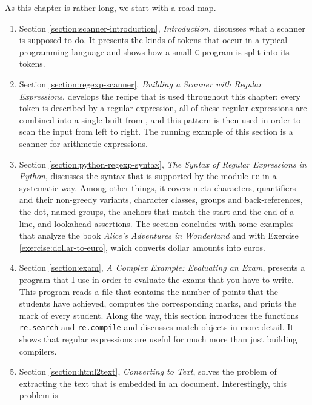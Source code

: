 As this chapter is rather long, we start with a road map.
\begin{enumerate}
\item Section \ref{section:scanner-introduction}, \emph{Introduction}, discusses what a
      scanner is supposed to do.  It presents the kinds of tokens that occur in a typical
      programming language and shows how a small \texttt{C} program is split into its tokens.
\item Section \ref{section:regexp-scanner}, \emph{Building a Scanner with Regular Expressions}, develops the
      recipe that is used throughout this chapter: every token is described by a regular expression, all of
      these regular expressions are combined into a single  built from 
      , and this pattern is then used in order to
      scan the input from left 
      to right.  The running example of this section is a scanner for arithmetic expressions.
\item Section \ref{section:python-regexp-syntax},
      \emph{The Syntax of Regular Expressions in \textsl{Python}}, 
      discusses the syntax that is supported by the module \texttt{re} in a systematic
      way.  Among other things, 
      it covers meta-characters, quantifiers and their non-greedy variants, character classes, groups and
      back-references, the dot, named groups, the anchors that match the start and the end of a line, and
      lookahead assertions.  The section concludes with some examples that analyze the book \emph{Alice's
      Adventures in Wonderland} and with Exercise \ref{exercise:dollar-to-euro}, which
      converts dollar amounts into euros.  
\item Section \ref{section:exam}, \emph{A Complex Example: Evaluating an Exam}, presents a
      program that I use in 
      order to evaluate the exams that you have to write.  This program reads a file that contains the number of
      points that the students have achieved, computes the corresponding marks, and prints the mark of every
      student.  Along the way, this section introduces the functions \texttt{re.search} and
      \texttt{re.compile} and discusses match objects in more detail.  It shows that regular expressions are useful for
      much more than just building compilers.
\item Section \ref{section:html2text}, \emph{Converting  to Text}, solves the problem of
      extracting the text that is embedded in an  document.  Interestingly, this problem is

\end{enumerate}
